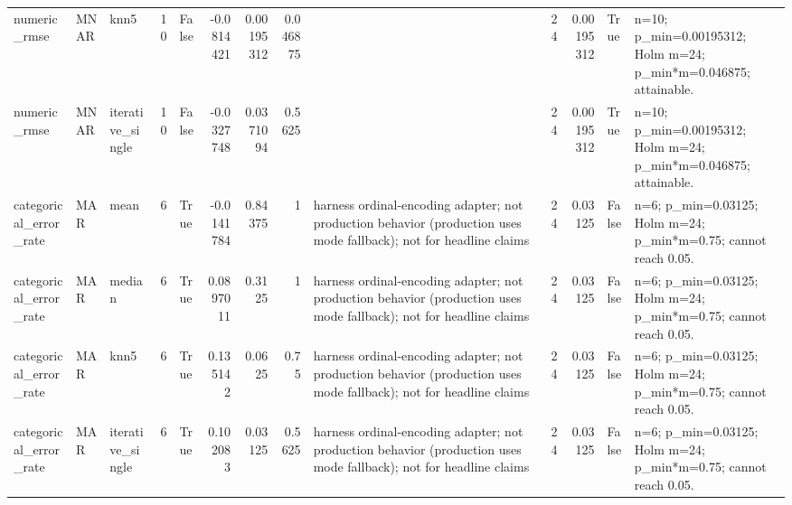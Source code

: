 \begin{table}[ht]
\begin{tabular}{lllrlrrrlrrll}
 numeric\_rmse           & MNAR        & knn5             &           10 & False               &      -0.0814421  & 0.00195312 & 0.046875 &                                                                                                                    &                             24 &                         0.00195312 & True                        & n=10; p\_min=0.00195312; Holm m=24; p\_min*m=0.046875; attainable. \\
 numeric\_rmse           & MNAR        & iterative\_single &           10 & False               &      -0.0327748  & 0.0371094  & 0.5625   &                                                                                                                    &                             24 &                         0.00195312 & True                        & n=10; p\_min=0.00195312; Holm m=24; p\_min*m=0.046875; attainable. \\
 categorical\_error\_rate & MAR         & mean             &            6 & True                &      -0.0141784  & 0.84375    & 1        & harness ordinal-encoding adapter; not production behavior (production uses mode fallback); not for headline claims &                             24 &                         0.03125    & False                       & n=6; p\_min=0.03125; Holm m=24; p\_min*m=0.75; cannot reach 0.05.  \\
 categorical\_error\_rate & MAR         & median           &            6 & True                &       0.0897011  & 0.3125     & 1        & harness ordinal-encoding adapter; not production behavior (production uses mode fallback); not for headline claims &                             24 &                         0.03125    & False                       & n=6; p\_min=0.03125; Holm m=24; p\_min*m=0.75; cannot reach 0.05.  \\
 categorical\_error\_rate & MAR         & knn5             &            6 & True                &       0.135142   & 0.0625     & 0.75     & harness ordinal-encoding adapter; not production behavior (production uses mode fallback); not for headline claims &                             24 &                         0.03125    & False                       & n=6; p\_min=0.03125; Holm m=24; p\_min*m=0.75; cannot reach 0.05.  \\
 categorical\_error\_rate & MAR         & iterative\_single &            6 & True                &       0.102083   & 0.03125    & 0.5625   & harness ordinal-encoding adapter; not production behavior (production uses mode fallback); not for headline claims &                             24 &                         0.03125    & False                       & n=6; p\_min=0.03125; Holm m=24; p\_min*m=0.75; cannot reach 0.05.  \\

\end{tabular}
\end{table}

